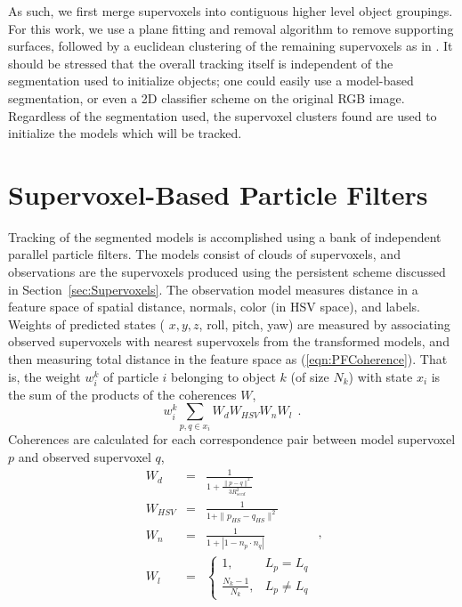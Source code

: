 As such, we first merge supervoxels into contiguous higher level object groupings. For this work, we use a plane fitting and removal algorithm to remove supporting surfaces, followed by a euclidean clustering of the remaining supervoxels as in \cite{Radu3dIsHere}. It should be stressed that the overall tracking itself is independent of the segmentation used to initialize objects; one could easily use a model-based segmentation, or even a 2D classifier scheme on the original RGB image. Regardless of the segmentation used, the supervoxel clusters found are used to initialize the models which will be tracked.

\section{Supervoxel-Based Particle Filters}
Tracking of the segmented models is accomplished using a bank of independent parallel particle filters. The models consist of clouds of supervoxels, and observations are the supervoxels produced using the persistent scheme discussed in Section~\ref{sec:Supervoxels}. The observation model measures distance in a feature space of spatial distance, normals, color (in HSV space), and labels. Weights of predicted states ( $x,y,z$, roll, pitch, yaw) are measured by associating observed supervoxels with nearest supervoxels from the transformed models, and then measuring total distance in the feature space as (\ref{eqn:PFCoherence}). That is, the weight $w^k_i$ of particle $i$ belonging to object $k$ (of size $N_k$) with state $x_i$ is the sum of the products of the coherences $W$,
\begin{equation}
\label{eqn:PFCoherence}
w^k_{i} \sum_{p,q \in x_i} W_d W_{HSV} W_n W_l ~~.
\end{equation}
Coherences are calculated for each correspondence pair between model supervoxel $p$ and observed supervoxel $q$,
\begin{equation}
\label{eqn:DistTerms}
 \begin{array}{lcl}
 W_d & = & \frac{1}{1 + \frac{ \| p - q \|^2}{3 {R}_{seed}^{2}}} \\
 W_{HSV} & = & \frac{1}{1 + \|p_{HS}-q_{HS}\|^2} \\
 W_n & = & \frac{1}{ 1 + \left| 1 - n_p \cdot n_q \right| } \\
 W_l & = & \begin{cases} 1, & L_p = L_q \\ 
                         \frac{N_k-1}{N_k}, & L_p \neq L_q 
           \end{cases} 
 \end{array} ,
\end{equation}

